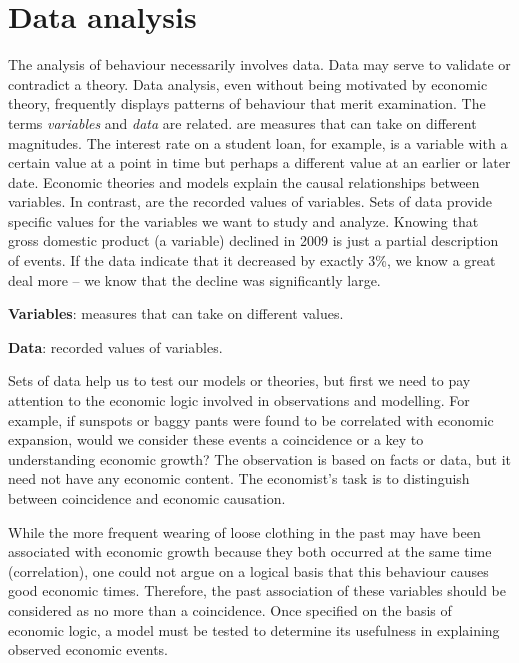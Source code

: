 \section{Data analysis}\label{sec:ch2sec1}

The analysis of behaviour necessarily involves data. Data may serve to
validate or contradict a theory. Data analysis, even without being motivated
by economic theory, frequently displays patterns of behaviour that merit
examination. The terms \textit{variables} and \textit{data} are related. %
 are measures that can take on different magnitudes.
The interest rate on a student loan, for example, is a variable with a
certain value at a point in time but perhaps a different value at an earlier
or later date. Economic theories and models explain the causal relationships
between variables. In contrast,  are the recorded values
of variables. Sets of data provide specific values for the variables we want
to study and analyze. Knowing that gross domestic product (a variable)
declined in 2009 is just a partial description of events. If the data
indicate that it decreased by exactly 3\%, we know a great deal more -- we
know that the decline was significantly large.

\begin{DefBox}
\textbf{Variables}: measures that can take on different values.

\textbf{Data}: recorded values of variables.
\end{DefBox}

Sets of data help us to test our models or theories, but first we need to
pay attention to the economic logic involved in observations and modelling.
For example, if sunspots or baggy pants were found to be correlated with
economic expansion, would we consider these events a coincidence or a key to
understanding economic growth? The observation is based on facts or data, but
it need not have any economic content. The economist's task is to
distinguish between coincidence and economic causation.

While the more frequent wearing of loose clothing in the past may have been
associated with economic growth because they both occurred at the same time
(correlation), one could not argue on a logical basis that this behaviour
causes good economic times. Therefore, the past association of these
variables should be considered as no more than a coincidence. Once specified
on the basis of economic logic, a model must be tested to determine its
usefulness in explaining observed economic events.

